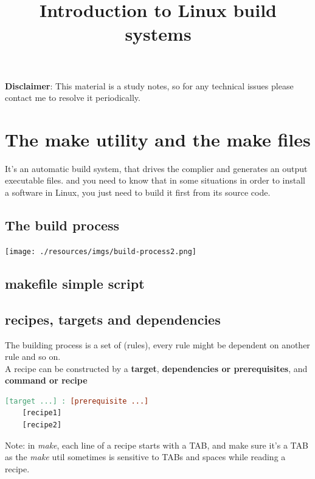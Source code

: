 \documentclass{article}
\title{\textbf{Introduction to Linux build systems}}
\author{}
\date{}
\begin{document}
\textbf{Disclaimer}: This material is a study notes, so for any technical issues please contact me to resolve it periodically.

\begin{minipage}{\textwidth}
    \maketitle
\end{minipage}

\tableofcontents{}
\section{The make utility and the make files}
It's an automatic build system, that drives the complier and generates an output executable files. and you need to know that in some situations in order to install a software in Linux, you just need to build it first from its source code.

\subsection{The build process}

\begin{center}
\texttt{[image: ./resources/imgs/build-process2.png]}
\end{center}

\subsection{makefile simple script}

\subsection{recipes, targets and dependencies}
The building process is a set of (rules), every rule might be dependent on another rule and so on.\\
A recipe can be constructed by a \textbf{target}, \textbf{dependencies or prerequisites}, and \textbf{command or recipe}

\begin{lstlisting}[language=make, caption=make rule structure]
[target ...] : [prerequisite ...]
    [recipe1]
    [recipe2]
\end{lstlisting}

Note: in \textit{make}, each line of a recipe starts with a TAB, and make sure it's a TAB as the \textit{make} util sometimes is sensitive to TABs and spaces while reading a recipe.\\
\end{document}
